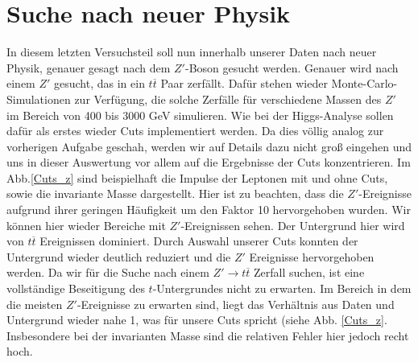 \section{Suche nach neuer Physik}

In diesem letzten Versuchsteil soll nun innerhalb unserer Daten nach neuer Physik, genauer gesagt nach dem $Z'$-Boson gesucht werden.
Genauer wird nach einem $Z'$ gesucht, das in ein $t \overline{t}$ Paar zerfällt.
Dafür stehen wieder Monte-Carlo-Simulationen zur Verfügung, die solche Zerfälle für verschiedene Massen des $Z'$ im Bereich von 400 bis 3000 GeV simulieren.
Wie bei der Higgs-Analyse sollen dafür als erstes wieder Cuts implementiert werden.
Da dies völlig analog zur vorherigen Aufgabe geschah, werden wir auf Details dazu nicht groß eingehen und uns in dieser Auswertung vor allem auf die Ergebnisse der Cuts konzentrieren.
Im Abb.\ref{Cuts_z} sind beispielhaft die Impulse der Leptonen mit und ohne Cuts, sowie die invariante Masse dargestellt.
Hier ist zu beachten, dass die $Z'$-Ereignisse aufgrund ihrer geringen Häufigkeit um den Faktor 10 hervorgehoben wurden.
Wir können hier wieder Bereiche mit $Z'$-Ereignissen sehen.
Der Untergrund hier wird von $t \overline{t}$ Ereignissen dominiert.
Durch Auswahl unserer Cuts konnten der Untergrund wieder deutlich reduziert und die $Z'$ Ereignisse hervorgehoben werden.
Da wir für die Suche nach einem $Z' \rightarrow t \overline {t}$ Zerfall suchen, ist eine vollständige Beseitigung des $t$-Untergrundes nicht zu erwarten.
Im Bereich in dem die meisten $Z'$-Ereignisse zu erwarten sind, liegt das Verhältnis aus Daten und Untergrund wieder nahe 1, was für unsere Cuts spricht (siehe Abb. \ref{Cuts_z}.
Insbesondere bei der invarianten Masse sind die relativen Fehler hier jedoch recht hoch.
